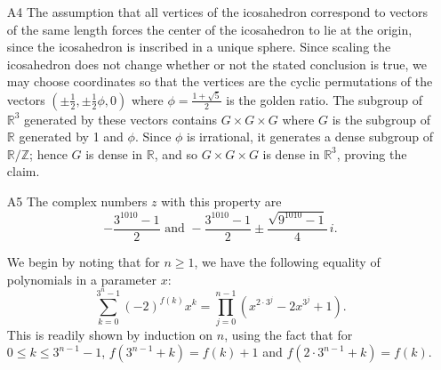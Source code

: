 \documentclass[amssymb,twocolumn,pra,10pt,aps]{revtex4-1}
\newcommand{\RR}{\mathbb{R}}
\newcommand{\ZZ}{\mathbb{Z}}
\begin{document}
\begin{itemize}
\item[A4]
The assumption that all vertices of the icosahedron correspond to vectors of the same length forces the center of the icosahedron to lie at the origin, since the icosahedron is inscribed in a unique sphere.
Since scaling the icosahedron does not change whether or not the stated conclusion is true, we may choose coordinates so that the vertices are the cyclic permutations of the vectors $(\pm \frac{1}{2}, \pm \frac{1}{2} \phi, 0)$ where
$\phi = \frac{1+\sqrt{5}}{2}$ is the golden ratio. The subgroup of $\RR^3$ generated by these vectors contains $G \times G \times G$ where $G$ is the subgroup of $\RR$ generated by 1 and $\phi$. Since $\phi$ is irrational, it generates a dense subgroup of $\RR/\ZZ$; hence $G$ is dense in $\RR$, and so $G \times G \times G$ is dense in $\RR^3$,
proving the claim.

\item[A5]
The complex numbers $z$ with this property are
\[
-\frac{3^{1010}-1}{2} \text{ and } -\frac{3^{1010}-1}{2}\pm\frac{\sqrt{9^{1010}-1}}{4}\,i.
\]

We begin by noting that for $n \geq 1$, we have the following equality of polynomials in a parameter $x$:
\[
\sum_{k=0}^{3^n-1} (-2)^{f(k)} x^k = \prod_{j=0}^{n-1} (x^{2\cdot 3^j}-2x^{3^j}+1).
\]
This is readily shown by induction on $n$, using the fact that for $0\leq k\leq 3^{n-1}-1$, $f(3^{n-1}+k)=f(k)+1$ and $f(2\cdot 3^{n-1}+k)=f(k)$.


\end{itemize}
\end{document}
